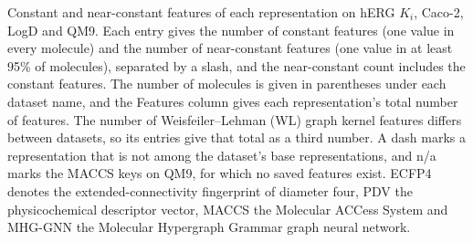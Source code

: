 \begin{table}[htbp]
\begin{adjustbox}{max width=\textwidth}
\end{adjustbox}
\caption[Constant and near-constant features per representation, part 1.]{Constant and near-constant features of each representation on hERG $K_i$, Caco-2, LogD and QM9. Each entry gives the number of constant features (one value in every molecule) and the number of near-constant features (one value in at least 95\% of molecules), separated by a slash, and the near-constant count includes the constant features. The number of molecules is given in parentheses under each dataset name, and the Features column gives each representation's total number of features. The number of Weisfeiler--Lehman (WL) graph kernel features differs between datasets, so its entries give that total as a third number. A dash marks a representation that is not among the dataset's base representations, and n/a marks the MACCS keys on QM9, for which no saved features exist. ECFP4 denotes the extended-connectivity fingerprint of diameter four, PDV the physicochemical descriptor vector, MACCS the Molecular ACCess System and MHG-GNN the Molecular Hypergraph Grammar graph neural network.}
\label{tab:constant_features}
\end{table}

